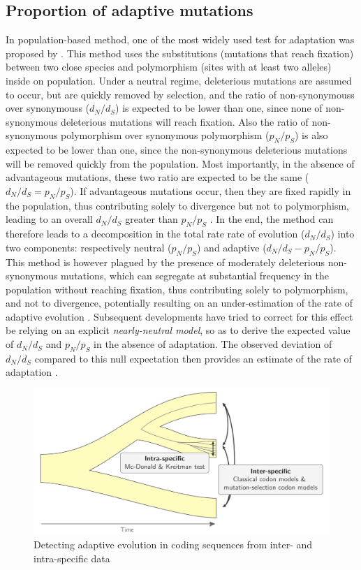 \subsection{Proportion of adaptive mutations}
In population-based method, one of the most widely used test for adaptation was proposed by \citet{McDonald1991}. This method uses the \glspl{substitution} (mutations that reach fixation) between two close species and polymorphism (sites with at least two alleles) inside on population. Under a \gls{neutral} regime, deleterious mutations are assumed to occur, but are quickly removed by selection, and the ratio of \glspl{non-synonymous} over \glspl{synonymous} ($d_N/d_S$) is expected to be lower than one, since none of non-synonymous deleterious mutations will reach fixation. Also the ratio of non-synonymous polymorphism over synonymous polymorphism ($p_N/p_S$) is also expected to be lower than one, since the non-synonymous deleterious mutations will be removed quickly from the population. Most importantly, in the absence of advantageous mutations, these two ratio are expected to be the same ($d_N/d_S=p_N/p_S$). If advantageous mutations occur, then they are fixed rapidly in the population, thus contributing solely to divergence but not to polymorphism, leading to an overall $d_N/d_S$ greater than $p_N/p_S$ \citep{smith_adaptive_2002}. In the end, the method can therefore leads to a decomposition in the total rate rate of evolution ($d_N/d_S$) into two components: respectively \gls{neutral} ($p_N/p_S$) and adaptive ($d_N/d_S-p_N/p_S$). This method is however plagued by the presence of moderately deleterious non-synonymous mutations, which can segregate at substantial frequency in the population without reaching fixation, thus contributing solely to polymorphism, and not to divergence, potentially resulting on an under-estimation of the rate of adaptive evolution \citep{eyre-walker_quantifying_2002}. Subsequent developments have tried to correct for this effect be relying on an explicit \textit{nearly-neutral model}, so as to derive the expected value of $d_N/d_S$ and $p_N/p_S$ in the absence of adaptation. The observed deviation of $d_N/d_S$ compared to this null expectation then provides an estimate of the rate of adaptation \citep{eyre-walker_estimating_2009, Galtier2016}.

\begin{figure}[thbp]
	\centering
		\includegraphics[width=\textwidth] {figures/inter-intra}
	\caption{Detecting adaptive evolution in coding sequences from inter- and intra-specific data}
\end{figure}

